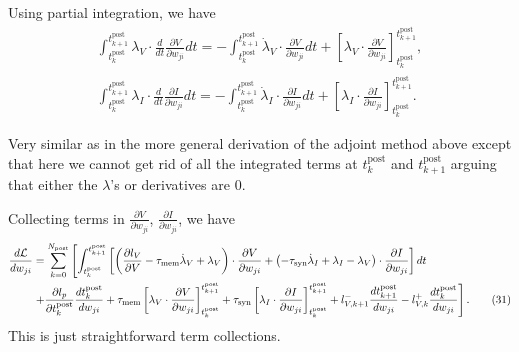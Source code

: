 \documentclass[a4paper]{article}
\newcommand{\blue}[1]{{\color{blue}#1}}
\begin{document}
\blue{
  Using partial integration, we have
  \begin{align}
    \int_{t_k^{\text{post}}}^{t_{k+1}^{\text{post}}} \lambda_V \cdot
    \frac{d}{dt} \frac{\partial V}{\partial w_{ji}} dt =
    - \int_{t_k^{\text{post}}}^{t_{k+1}^{\text{post}}} \dot{\lambda}_V
\cdot \frac{\partial V}{\partial w_{ji}} dt + \left[\lambda_V \cdot
  \frac{\partial V}{\partial w_{ji}}
  \right]_{t_k^{\text{post}}}^{t_{k+1}^{\text{post}}} , \tag{29} \\
    \int_{t_k^{\text{post}}}^{t_{k+1}^{\text{post}}} \lambda_I \cdot
    \frac{d}{dt} \frac{\partial I}{\partial w_{ji}} dt =
    - \int_{t_k^{\text{post}}}^{t_{k+1}^{\text{post}}} \dot{\lambda}_I
\cdot \frac{\partial I}{\partial w_{ji}} dt + \left[\lambda_I \cdot
  \frac{\partial I}{\partial w_{ji}}
  \right]_{t_k^{\text{post}}}^{t_{k+1}^{\text{post}}}. \tag{30}
  \end{align}
  }

Very similar as in the more general derivation of the adjoint method
above except that here we cannot get rid of all the integrated terms
at $t_k^{\text{post}}$ and $t_{k+1}^{\text{post}}$ arguing that either
the $\lambda$'s or derivatives are $0$.

\blue{
  Collecting terms in $\frac{\partial V}{\partial w_{ji}}$,
  $\frac{\partial I}{\partial w_{ji}}$, we have
  \begin{align}
    \frac{d \cal L}{d w_{ji}} &= \sum_{k=0}^{N_{\text{post}}} \left[
      \int_{t_k^{\text{post}}}^{t_{k+1}^{\text{post}}} \left[\left(
        \frac{\partial l_V}{\partial V} - \tau_{\text{mem}}
        \dot{\lambda}_V + \lambda_V \right) \cdot \frac{\partial
          V}{\partial w_{ji}} + \left( - \tau_{\text{syn}}
        \dot{\lambda}_I + \lambda_I - \lambda_V \right) \cdot
        \frac{\partial I}{\partial w_{ji}} \right] dt
      \right. \nonumber \\
      & \left. + \frac{\partial l_p}{\partial t_k^{\text{post}}} \frac{d
        t_k^{\text{post}}}{d w_{ji}}
      +\tau_{\text{mem}} \left[ \lambda_V \cdot \frac{\partial
          V}{\partial w_{ji}}
        \right]_{t_k^{\text{post}}}^{t_{k+1}^{\text{post}}}
      +\tau_{\text{syn}} \left[\lambda_I \cdot \frac{\partial
          I}{\partial w_{ji}} \right]_{t_k^{\text{post}}}^{t_{k+1}^{\text{post}}}
      + l^-_{V,k+1}
      \frac{dt_{k+1}^{\text{post}}}{d w_{ji}} - l^+_{V,k} \frac{d
        t_k^{\text{post}}}{d w_{ji}} \right]. \tag{31}
  \end{align}
}
This is just straightforward term collections.
\end{document}
